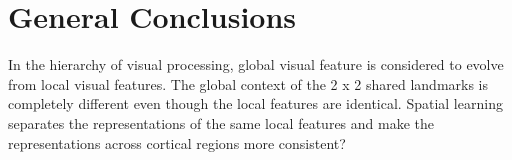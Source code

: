 \chapter{General Conclusions}
\label{chapterlabel4}

In the hierarchy of visual processing, global visual feature is considered to evolve from local visual features. The global context of the 2 x 2 shared landmarks is completely different even though the local features are identical. Spatial learning separates the representations of the same local features and make the representations across cortical regions more consistent?
